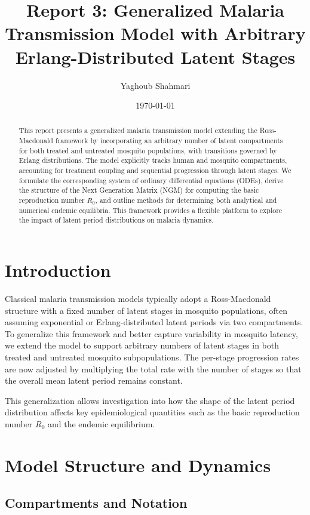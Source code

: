 \documentclass[12pt]{article}
\title{Report 3: Generalized Malaria Transmission Model with Arbitrary Erlang-Distributed Latent Stages}
\author{Yaghoub Shahmari}
\date{\today}
\begin{document}
\maketitle

\begin{abstract}
This report presents a generalized malaria transmission model extending the Ross-Macdonald framework by incorporating an arbitrary number of latent compartments for both treated and untreated mosquito populations, with transitions governed by Erlang distributions. The model explicitly tracks human and mosquito compartments, accounting for treatment coupling and sequential progression through latent stages. We formulate the corresponding system of ordinary differential equations (ODEs), derive the structure of the Next Generation Matrix (NGM) for computing the basic reproduction number \(R_0\), and outline methods for determining both analytical and numerical endemic equilibria. This framework provides a flexible platform to explore the impact of latent period distributions on malaria dynamics.
\end{abstract}

\section{Introduction}

Classical malaria transmission models typically adopt a Ross-Macdonald structure with a fixed number of latent stages in mosquito populations, often assuming exponential or Erlang-distributed latent periods via two compartments. To generalize this framework and better capture variability in mosquito latency, we extend the model to support arbitrary numbers of latent stages in both treated and untreated mosquito subpopulations. The per-stage progression rates are now adjusted by multiplying the total rate with the number of stages so that the overall mean latent period remains constant.

This generalization allows investigation into how the shape of the latent period distribution affects key epidemiological quantities such as the basic reproduction number \(R_0\) and the endemic equilibrium.

\section{Model Structure and Dynamics}

\subsection{Compartments and Notation}
\end{document}
